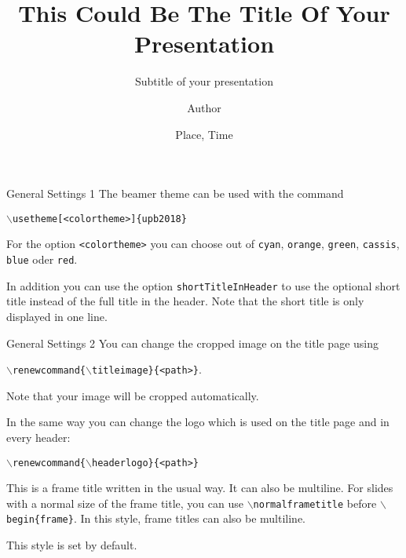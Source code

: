 \documentclass[
	] {beamer}
\title[SHORTTITLE]{This Could Be The Title Of Your Presentation}
\subtitle{Subtitle of your presentation}
\institute{PADERBORN UNIVERSITY} %
\author{Author}
\date{Place, Time}
\begin{document}
\begin{frame}[plain]
	\titlepage
\end{frame}



\begin{frame}{General Settings 1}
	The beamer theme  can be used with the command
	\begin{center}
		\texttt{$\backslash$usetheme[<colortheme>]\{upb2018\}}
	\end{center}

	For the option \texttt{<colortheme>} you can choose out of
	\texttt{cyan}, \texttt{orange}, \texttt{green}, \texttt{cassis}, \texttt{blue} oder
	\texttt{red}.

	In addition you can use the option \texttt{shortTitleInHeader} to
	use the optional short title instead of the full title in the header. Note that
	the short title is only displayed in one line.
\end{frame}



\begin{frame}{General Settings 2}
	You can change the cropped image on the title page using

	\begin{center}
		\texttt{$\backslash$renewcommand\{$\backslash$titleimage\}\{<path>\}}.
	\end{center}

	Note that your image will be cropped automatically.

	\vfill

	In the same way you can change the logo which is used on the title page and
	in every header:
	\begin{center}
		\texttt{$\backslash$renewcommand\{$\backslash$headerlogo\}\{<path>\}}
	\end{center}
\end{frame}



\normalframetitle %
\begin{frame}{This is a frame title written in the usual way. It can also
be multiline.}
	For slides with a normal size of the frame title, you can use \texttt{$\backslash$normalframetitle}
	before \texttt{$\backslash$begin\{frame\}}. In this style, frame titles can
	also be multiline.

	This style is set by default.
\end{frame}
\end{document}
